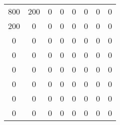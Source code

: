 \begin{tabular}{|c|c|c|c|c|c|c|c|}
  \hline
  800 & 200 & 0 & 0 & 0 & 0 & 0 & 0 \\
  200 & 0 & 0 & 0 & 0 & 0 & 0 & 0 \\
  0 & 0 & 0 & 0 & 0 & 0 & 0 & 0 \\
  0 & 0 & 0 & 0 & 0 & 0 & 0 & 0 \\
  0 & 0 & 0 & 0 & 0 & 0 & 0 & 0 \\
  0 & 0 & 0 & 0 & 0 & 0 & 0 & 0 \\
  0 & 0 & 0 & 0 & 0 & 0 & 0 & 0 \\
  0 & 0 & 0 & 0 & 0 & 0 & 0 & 0 \\
  \hline
\end{tabular}
